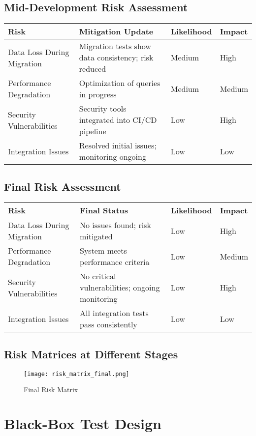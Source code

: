 \documentclass[12pt,a4paper]{report}
\begin{document}
\section{Mid-Development Risk Assessment}
\begin{longtable}{p{4cm} p{6cm} p{2cm} p{2cm}}
\toprule
\textbf{Risk} & \textbf{Mitigation Update} & \textbf{Likelihood} & \textbf{Impact} \\
\midrule
Data Loss During Migration & Migration tests show data consistency; risk reduced & Medium & High \\
Performance Degradation & Optimization of queries in progress & Medium & Medium \\
Security Vulnerabilities & Security tools integrated into CI/CD pipeline & Low & High \\
Integration Issues & Resolved initial issues; monitoring ongoing & Low & Low \\
\bottomrule
\end{longtable}

\section{Final Risk Assessment}
\begin{longtable}{p{4cm} p{6cm} p{2cm} p{2cm}}
\toprule
\textbf{Risk} & \textbf{Final Status} & \textbf{Likelihood} & \textbf{Impact} \\
\midrule
Data Loss During Migration & No issues found; risk mitigated & Low & High \\
Performance Degradation & System meets performance criteria & Low & Medium \\
Security Vulnerabilities & No critical vulnerabilities; ongoing monitoring & Low & High \\
Integration Issues & All integration tests pass consistently & Low & Low \\
\bottomrule
\end{longtable}

\section{Risk Matrices at Different Stages}
\begin{figure}[H]
\centering
\texttt{[image: risk\_matrix\_final.png]}
\caption{Final Risk Matrix}
\end{figure}

\chapter{Black-Box Test Design}
\end{document}
